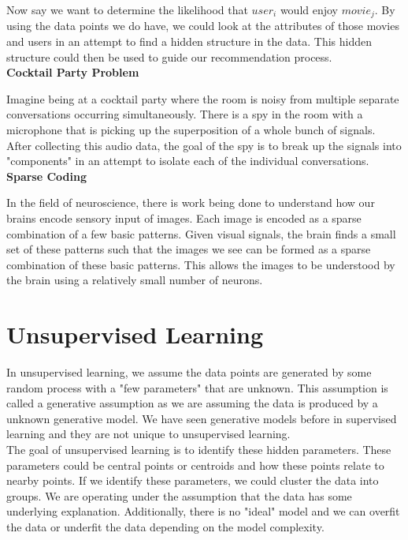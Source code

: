 \documentclass[english,course]{Notes}
\begin{document}
Now say we want to determine the likelihood that $user_i$ would enjoy $movie_j$. By using the data points we do have, we could look at the attributes of those movies and users in an attempt to find a hidden structure in the data. This hidden structure could then be used to guide our recommendation process. \\

\textbf{Cocktail Party Problem}

Imagine being at a cocktail party where the room is noisy from multiple separate conversations occurring simultaneously. There is a spy in the room with a microphone that is picking up the superposition of a whole bunch of signals. After collecting this audio data, the goal of the spy is to break up the signals into "components" in an attempt to isolate each of the individual conversations. \\

\textbf{Sparse Coding}

In the field of neuroscience, there is work being done to understand how our brains encode sensory input of images. Each image is encoded as a sparse combination of a few basic patterns. Given visual signals, the brain finds a small set of these patterns such that the images we see can be formed as a sparse combination of these basic patterns. This allows the images to be understood by the brain using a relatively small number of neurons.

\section{Unsupervised Learning}

In unsupervised learning, we assume the data points are generated by some random process with a "few parameters" that are unknown. This assumption is called a generative assumption as we are assuming the data is produced by a unknown generative model. We have seen generative models before in supervised learning and they are not unique to unsupervised learning. \\

The goal of unsupervised learning is to identify these hidden parameters. These parameters could be central points or centroids and how these points relate to nearby points. If we identify these parameters, we could cluster the data into groups. We are operating under the assumption that the data has some underlying explanation. Additionally, there is no "ideal" model and we can overfit the data or underfit the data depending on the model complexity. 
\end{document}

